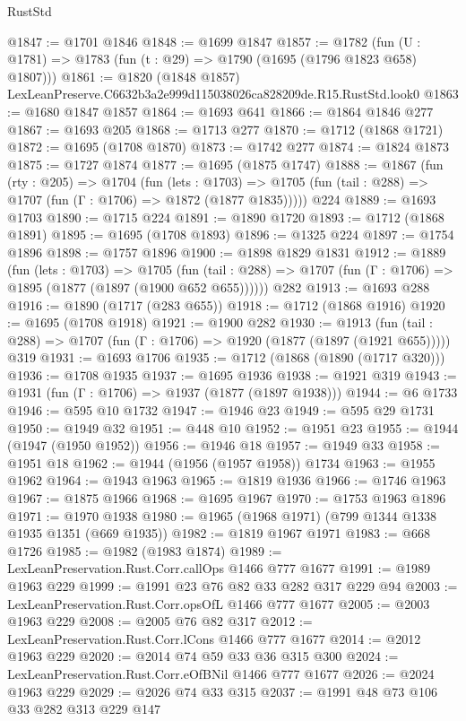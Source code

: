 \begin{lexlean}{RustStd}
\begin{coremodule}
@1847 := @1701 @1846
@1848 := @1699 @1847
@1857 := @1782 (fun (U : @1781) => @1783 (fun (t : @29) => @1790 (@1695 (@1796 @1823 @658) @1807)))
@1861 := @1820 (@1848 @1857) LexLeanPreserve.C6632b3a2e999d115038026ca828209de.R15.RustStd.look0
@1863 := @1680 @1847 @1857
@1864 := @1693 @641
@1866 := @1864 @1846 @277
@1867 := @1693 @205
@1868 := @1713 @277
@1870 := @1712 (@1868 @1721)
@1872 := @1695 (@1708 @1870)
@1873 := @1742 @277
@1874 := @1824 @1873
@1875 := @1727 @1874
@1877 := @1695 (@1875 @1747)
@1888 := @1867
    (fun (rty : @205) =>
    @1704
      (fun (lets : @1703) =>
      @1705 (fun (tail : @288) => @1707 (fun (Γ : @1706) => @1872 (@1877 @1835)))))
    @224
@1889 := @1693 @1703
@1890 := @1715 @224
@1891 := @1890 @1720
@1893 := @1712 (@1868 @1891)
@1895 := @1695 (@1708 @1893)
@1896 := @1325 @224
@1897 := @1754 @1896
@1898 := @1757 @1896
@1900 := @1898 @1829 @1831
@1912 := @1889
    (fun (lets : @1703) =>
    @1705 (fun (tail : @288) => @1707 (fun (Γ : @1706) => @1895 (@1877 (@1897 (@1900 @652 @655))))))
    @282
@1913 := @1693 @288
@1916 := @1890 (@1717 (@283 @655))
@1918 := @1712 (@1868 @1916)
@1920 := @1695 (@1708 @1918)
@1921 := @1900 @282
@1930 := @1913
    (fun (tail : @288) => @1707 (fun (Γ : @1706) => @1920 (@1877 (@1897 (@1921 @655)))))
    @319
@1931 := @1693 @1706
@1935 := @1712 (@1868 (@1890 (@1717 @320)))
@1936 := @1708 @1935
@1937 := @1695 @1936
@1938 := @1921 @319
@1943 := @1931 (fun (Γ : @1706) => @1937 (@1877 (@1897 @1938)))
@1944 := @6 @1733
@1946 := @595 @10 @1732
@1947 := @1946 @23
@1949 := @595 @29 @1731
@1950 := @1949 @32
@1951 := @448 @10
@1952 := @1951 @23
@1955 := @1944 (@1947 (@1950 @1952))
@1956 := @1946 @18
@1957 := @1949 @33
@1958 := @1951 @18
@1962 := @1944 (@1956 (@1957 @1958)) @1734
@1963 := @1955 @1962
@1964 := @1943 @1963
@1965 := @1819 @1936
@1966 := @1746 @1963
@1967 := @1875 @1966
@1968 := @1695 @1967
@1970 := @1753 @1963 @1896
@1971 := @1970 @1938
@1980 := @1965 (@1968 @1971) (@799 @1344 @1338 @1935 @1351 (@669 @1935))
@1982 := @1819 @1967 @1971
@1983 := @668 @1726
@1985 := @1982 (@1983 @1874)
@1989 := LexLeanPreservation.Rust.Corr.callOps @1466 @777 @1677
@1991 := @1989 @1963 @229
@1999 := @1991 @23 @76 @82 @33 @282 @317 @229 @94
@2003 := LexLeanPreservation.Rust.Corr.opsOfL @1466 @777 @1677
@2005 := @2003 @1963 @229
@2008 := @2005 @76 @82 @317
@2012 := LexLeanPreservation.Rust.Corr.lCons @1466 @777 @1677
@2014 := @2012 @1963 @229
@2020 := @2014 @74 @59 @33 @36 @315 @300
@2024 := LexLeanPreservation.Rust.Corr.eOfBNil @1466 @777 @1677
@2026 := @2024 @1963 @229
@2029 := @2026 @74 @33 @315
@2037 := @1991 @48 @73 @106 @33 @282 @313 @229 @147

\end{coremodule}
\end{lexlean}
